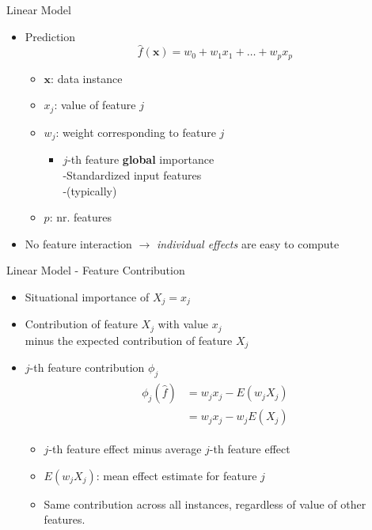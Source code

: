 \begin{frame}{Linear Model}
	\begin{itemize}
		\item Prediction
		\begin{equation}
			\hat{f}(\bm{x})=w_0+w_1 x_{1} + \dots + w_p x_ p
		\end{equation}
		\begin{itemize}
			\item $\bm{x}$: data instance
			\item $x_j$: value of feature $j$
			\item $w_j$: weight corresponding to feature $j$
			\begin{itemize}
				\item $j$-th feature \textbf{global} importance 
				\\-Standardized input features
				\\-(typically) 
			\end{itemize}
			\item $p$: nr. features
		\end{itemize}
		\item No feature interaction $\rightarrow$ \emph{individual effects} are easy to compute
	\end{itemize}
\end{frame}
\begin{frame}{Linear Model - Feature Contribution}
	\begin{itemize}
		\item Situational importance of $X_j = x_j$~\cite{achen1982interpreting}
		\item Contribution of feature $X_j$ with value $x_j$
		\\minus the expected contribution of feature $X_j$
		\item $j$-th feature contribution $\phi_j$
		\begin{align}
			\begin{split}
				\phi_j(\hat{f})
				&=w_{j}x_j-E(w_{j}X_{j})\\
				&=w_{j}x_j-w_{j}E(X_{j})
			\end{split}
		\end{align}
		\begin{itemize}
			\item $j$-th feature effect minus average $j$-th feature effect
			\item $E(w_{j}X_{j})$: mean effect estimate for feature $j$
			\item Same contribution across all instances, regardless of value of other features.
		\end{itemize}
	\end{itemize}
\end{frame}
